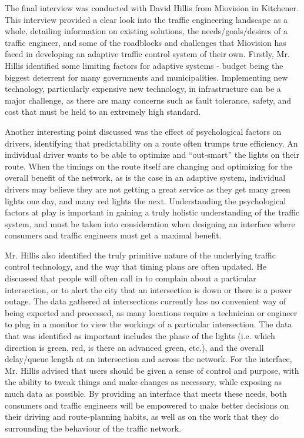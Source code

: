 \documentclass{report}
\begin{document}
The final interview was conducted with David Hillis from Miovision in Kitchener.
This interview provided a clear look into the traffic engineering landscape as a whole, detailing information on existing solutions, the needs/goals/desires of a traffic engineer, and some of the roadblocks and challenges that Miovision has faced in developing an adaptive traffic control system of their own.
Firstly, Mr. Hillis identified some limiting factors for adaptive systems - budget being the biggest deterrent for many governments and municipalities.
Implementing new technology, particularly expensive new technology, in infrastructure can be a major challenge, as there are many concerns such as fault tolerance, safety, and cost that must be held to an extremely high standard.

Another interesting point discussed was the effect of psychological factors on drivers, identifying that predictability on a route often trumps true efficiency.
An individual driver wants to be able to optimize and ``out-smart'' the lights on their route.
When the timings on the route itself are changing and optimizing for the overall benefit of the network, as is the case in an adaptive system, individual drivers may believe they are not getting a great service as they get many green lights one day, and many red lights the next.
Understanding the psychological factors at play is important in gaining a truly holistic understanding of the traffic system, and must be taken into consideration when designing an interface where consumers and traffic engineers must get a maximal benefit.

Mr. Hillis also identified the truly primitive nature of the underlying traffic control technology, and the way that timing plans are often updated.
He discussed that people will often call in to complain about a particular intersection, or to alert the city that an intersection is down or there is a power outage.
The data gathered at intersections currently has no convenient way of being exported and processed, as many locations require a technician or engineer to plug in a monitor to view the workings of a particular intersection.
The data that was identified as important includes the phase of the lights (i.e. which direction is green, red, is there an advanced green, etc.), and the overall delay/queue length at an intersection and across the network.
For the interface, Mr. Hillis advised that users should be given a sense of control and purpose, with the ability to tweak things and make changes as necessary, while exposing as much data as possible.
By providing an interface that meets these needs, both consumers and traffic engineers will be empowered to make better decisions on their driving and route-planning habits, as well as on the work that they do surrounding the behaviour of the traffic network.
\end{document}
